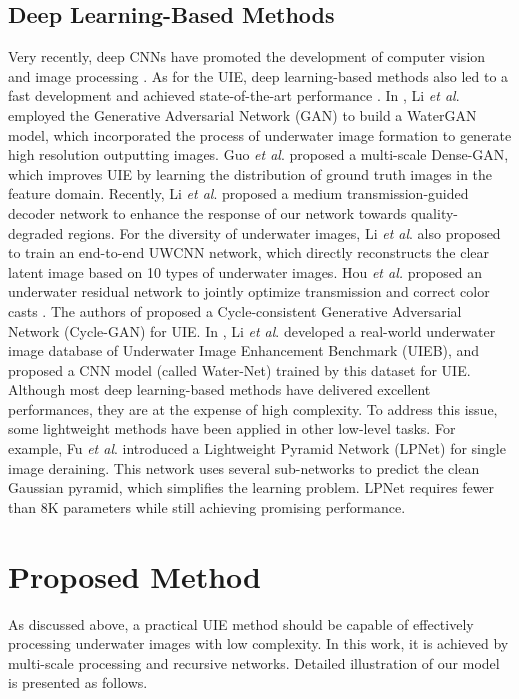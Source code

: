 \documentclass[journal]{IEEEtran}
\begin{document}
\subsection{Deep Learning-Based Methods}
Very recently, deep CNNs have promoted the development
of computer vision and image processing \cite{8100962,8820082,li2020asif,zheng2020scale,li2018deep,liu2019theoretically,dehazeli2018single,fu2017removing,Zero-DCE++}. 
As for the UIE, deep learning-based methods also
led to a fast development and achieved state-of-the-art performance \cite{uwcnn,dense-gan,li2017watergan,water-net,water-gan,lu2018low}. In \cite{li2017watergan}, Li \textit{et al}. employed the Generative Adversarial Network (GAN) to build a WaterGAN model, which incorporated the process of underwater image formation to generate high resolution outputting images. Guo \textit{et al}. \cite{dense-gan} proposed a multi-scale Dense-GAN, which improves UIE by learning the distribution of ground truth images in the feature domain. Recently, Li \textit{et al}. \cite{li2021underwater} proposed a medium transmission-guided decoder network to enhance the response of our network
towards quality-degraded regions. For the diversity of underwater images, Li \textit{et al}. \cite{uwcnn} also proposed to train an end-to-end UWCNN network, which directly reconstructs the clear latent image based on 10 types of underwater images. Hou \textit{et al.} proposed an underwater residual network to jointly optimize transmission and correct color casts \cite{hou2018joint}. The authors of \cite{water-gan} proposed a Cycle-consistent Generative Adversarial Network (Cycle-GAN) for UIE. In \cite{water-net}, Li \textit{et al}. developed a real-world underwater image database of Underwater Image Enhancement Benchmark (UIEB), and proposed a CNN model (called Water-Net) trained by this dataset for UIE. Although most deep learning-based methods have delivered excellent performances, they are at the expense of high complexity. To address this issue, some lightweight methods have been applied in other low-level tasks. For example, Fu \textit{et al}. \cite{fu2019lightweight} introduced a Lightweight Pyramid Network (LPNet) for single image deraining. This network uses several sub-networks to predict the clean Gaussian pyramid, which simplifies the learning problem. LPNet requires fewer than 8K parameters while still achieving promising performance.


\section{Proposed Method}
As discussed above, a practical UIE method should be capable of effectively processing underwater images with low complexity. In this work, it is achieved by multi-scale processing and recursive networks. Detailed illustration of our model is presented as follows.
\end{document}
